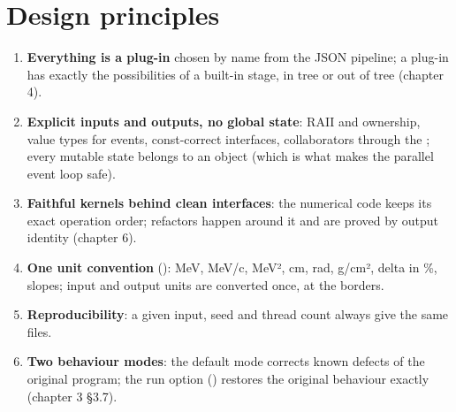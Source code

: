 \section{\texorpdfstring{Design principles}{Design principles}}\label{developer_manual-01u5foverview:13-design-principles}
\begin{enumerate}
\item \textbf{Everything is a plug-in} chosen by name from the JSON pipeline; a plug-in has exactly the possibilities of a
built-in stage, in tree or out of tree (chapter 4).
\item \textbf{Explicit inputs and outputs, no global state}: RAII and  ownership, value types for events,
const-correct interfaces, collaborators through the ; every mutable state belongs to an object (which is
what makes the parallel event loop safe).
\item \textbf{Faithful kernels behind clean interfaces}: the numerical code keeps its exact operation order; refactors happen
around it and are proved by output identity (chapter 6).
\item \textbf{One unit convention} (): MeV, MeV/c, MeV², cm, rad, g/cm², delta in \%, slopes; input and output
units are converted once, at the borders.
\item \textbf{Reproducibility}: a given input, seed and thread count always give the same files.
\item \textbf{Two behaviour modes}: the default mode corrects known defects of the original program; the run option
 () restores the original behaviour exactly (chapter 3 §3.7).
\end{enumerate}

